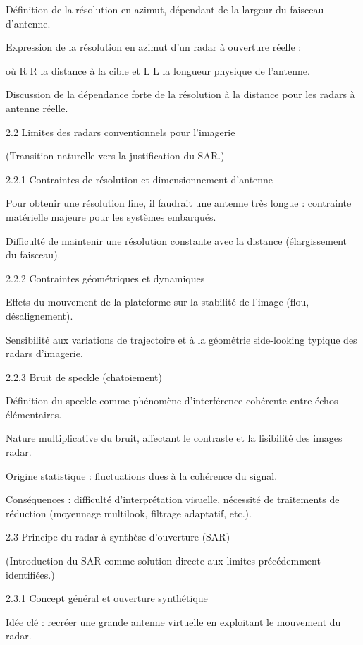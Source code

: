 Définition de la résolution en azimut, dépendant de la largeur du faisceau d’antenne.

Expression de la résolution en azimut d’un radar à ouverture réelle :




où 
R
R la distance à la cible et 
L
L la longueur physique de l’antenne.

Discussion de la dépendance forte de la résolution à la distance pour les radars à antenne réelle.

2.2 Limites des radars conventionnels pour l’imagerie

(Transition naturelle vers la justification du SAR.)

2.2.1 Contraintes de résolution et dimensionnement d’antenne

Pour obtenir une résolution fine, il faudrait une antenne très longue : contrainte matérielle majeure pour les systèmes embarqués.

Difficulté de maintenir une résolution constante avec la distance (élargissement du faisceau).

2.2.2 Contraintes géométriques et dynamiques

Effets du mouvement de la plateforme sur la stabilité de l’image (flou, désalignement).

Sensibilité aux variations de trajectoire et à la géométrie side-looking typique des radars d’imagerie.

2.2.3 Bruit de speckle (chatoiement)

Définition du speckle comme phénomène d’interférence cohérente entre échos élémentaires.

Nature multiplicative du bruit, affectant le contraste et la lisibilité des images radar.

Origine statistique : fluctuations dues à la cohérence du signal.

Conséquences : difficulté d’interprétation visuelle, nécessité de traitements de réduction (moyennage multilook, filtrage adaptatif, etc.).

2.3 Principe du radar à synthèse d’ouverture (SAR)

(Introduction du SAR comme solution directe aux limites précédemment identifiées.)

2.3.1 Concept général et ouverture synthétique

Idée clé : recréer une grande antenne virtuelle en exploitant le mouvement du radar.


